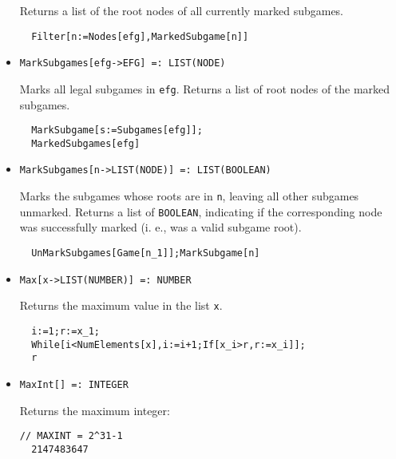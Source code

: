 \begin{itemize}
\bd 
Returns a list of the root nodes of all currently marked subgames.  
\begin{verbatim}
  Filter[n:=Nodes[efg],MarkedSubgame[n]]
\end{verbatim} 
\ed

\item{}
\protect \large \begin{verbatim}
MarkSubgames[efg->EFG] =: LIST(NODE) 
\end{verbatim}\normalsize

\bd 
Marks all legal subgames in \verb+efg+.  Returns a list of root nodes
of the marked subgames.  
\begin{verbatim}
  MarkSubgame[s:=Subgames[efg]];
  MarkedSubgames[efg]
\end{verbatim} 
\ed


\item{}
\protect \large \begin{verbatim}
MarkSubgames[n->LIST(NODE)] =: LIST(BOOLEAN) 
\end{verbatim}\normalsize

\bd 
Marks the subgames whose roots are in \verb+n+, leaving all other
subgames unmarked.  Returns a list of \verb+BOOLEAN+, indicating if
the corresponding node was successfully marked (i. e., was a valid
subgame root).
\begin{verbatim}
  UnMarkSubgames[Game[n_1]];MarkSubgame[n]
\end{verbatim} 
\ed

\item{}
\protect \large \begin{verbatim}
Max[x->LIST(NUMBER)] =: NUMBER 
\end{verbatim}\normalsize

\bd 
Returns the maximum value in the list \verb+x+.  
\begin{verbatim}
  i:=1;r:=x_1;
  While[i<NumElements[x],i:=i+1;If[x_i>r,r:=x_i]];
  r
\end{verbatim} 
\ed


\item{}
\protect \large \begin{verbatim}
MaxInt[] =: INTEGER 
\end{verbatim}\normalsize

\bd 
Returns the maximum integer:
\begin{verbatim}
// MAXINT = 2^31-1
  2147483647
\end{verbatim} 
\ed


\end{itemize}
